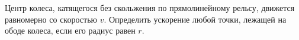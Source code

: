 Центр колеса, катящегося без скольжения по прямолинейному рельсу,
движется равномерно со скоростью $v$. Определить ускорение любой точки,
лежащей на ободе колеса, если его радиус равен $r$.
